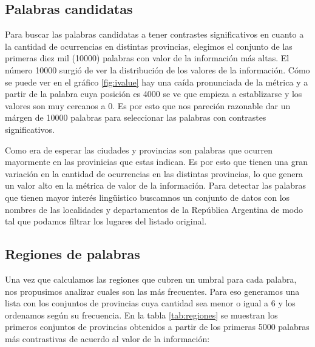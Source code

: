 \subsection{Palabras candidatas} %
\label{sub:palabras_candidatas}
Para buscar las palabras candidatas a tener contrastes significativos en cuanto a la cantidad de ocurrencias en distintas provincias, elegimos el conjunto de las primeras 
diez mil (10000) palabras con valor de la información más altas. El número 10000 surgió de ver la distribución de los valores de la información. Cómo se puede ver en 
el gráfico \ref{fig:ivalue} hay una caída pronunciada de la métrica y a partir de la palabra cuya posición es 4000 se ve que empieza a establizarse y los valores son 
muy cercanos a 0. Es por esto que nos pareción razonable dar un márgen de 10000 palabras para seleccionar las palabras con contrastes significativos.

Como era de esperar las ciudades y provincias son palabras que ocurren mayormente en las provinicias que estas indican. Es por esto que tienen una gran variación en 
la cantidad de ocurrencias en las distintas provincias, lo que genera un valor alto en la métrica de valor de la información. Para detectar las palabras que tienen 
mayor interés lingüistico buscamnos un conjunto de datos con los nombres de las localidades y departamentos de la República Argentina de modo tal que podamos filtrar 
los lugares del listado original.


\subsection{Regiones de palabras} %
\label{sub:regiones_de_palabras}

Una vez que calculamos las regiones que cubren un umbral para cada palabra, nos propusimos analizar cuales son las más frecuentes. Para eso generamos una lista con los conjuntos de provincias cuya cantidad sea menor o igual a 6 y los ordenamos según su frecuencia. En la tabla \ref{tab:regiones} se muestran los primeros conjuntos de provincias obtenidos a partir de los primeras 5000 palabras más contrastivas de acuerdo al valor de la información:

